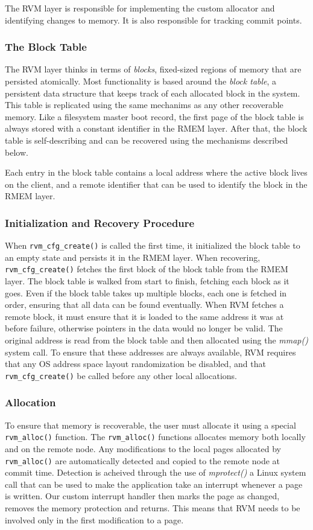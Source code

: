 The RVM layer is responsible for implementing the custom allocator and
identifying changes to memory. It is also responsible for tracking commit
points.

\subsubsection{The Block Table}
The RVM layer thinks in terms of \emph{blocks}, fixed-sized regions of
memory that are persisted atomically. Most functionality is based around the
\emph{block table}, a persistent data structure that keeps track of each
allocated block in the system. This table is replicated using the same
 mechanims as any other recoverable memory. Like a filesystem master boot record,
 the first page of the block table is always
stored with a constant identifier in the RMEM layer. After that, the block table
is self-describing and can be recovered using the mechanisms described below.

Each entry in the block table contains a local address where the active block
lives on the client, and a remote identifier that can be used to identify the
block in the RMEM layer. 

\subsubsection{Initialization and Recovery Procedure}
When \verb|rvm_cfg_create()| is called the first time, it initialized the
block table to an empty state and persists it in the RMEM layer. When
recovering, \verb|rvm_cfg_create()| fetches the first block of the block table from the
RMEM layer. The block table is walked from start to finish, fetching each block as it goes. Even if the block table takes up multiple blocks, each one is fetched in order, ensuring that all data
can be found eventually. When RVM fetches a remote block, it must ensure that it
is loaded to the same address it was at before failure, otherwise pointers in
the data would no longer be valid. The original address is read from the block
table and then allocated using the \emph{mmap()} system call. To ensure that
these addresses are always available, RVM requires that any OS address space
layout randomization be disabled, and that \verb|rvm_cfg_create()| be called before any
other local allocations.

\subsubsection{Allocation}
To ensure that memory is recoverable, the user must allocate it using a special
\verb|rvm_alloc()| function. The \verb|rvm_alloc()| functions allocates memory both locally and on the remote
node. Any modifications to the local pages allocated by \verb|rvm_alloc()| are
automatically detected and copied to the remote node at commit time. Detection
is acheived through the use of \emph{mprotect()} a Linux system call that
can be used to make the application take an interrupt whenever a page is
written. Our custom interrupt handler then marks the page as changed, removes
the memory protection and returns. This means that RVM needs to be involved only
in the first modification to a page.

